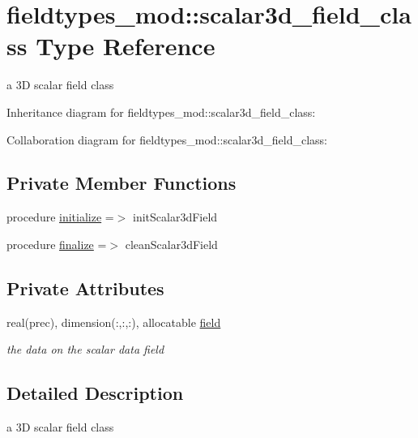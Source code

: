 \hypertarget{structfieldtypes__mod_1_1scalar3d__field__class}{}\section{fieldtypes\+\_\+mod\+:\+:scalar3d\+\_\+field\+\_\+class Type Reference}
\label{structfieldtypes__mod_1_1scalar3d__field__class}


a 3D scalar field class  




Inheritance diagram for fieldtypes\+\_\+mod\+:\+:scalar3d\+\_\+field\+\_\+class\+:


Collaboration diagram for fieldtypes\+\_\+mod\+:\+:scalar3d\+\_\+field\+\_\+class\+:
\subsection*{Private Member Functions}
\begin{DoxyCompactItemize}
\item 
procedure \mbox{\hyperlink{structfieldtypes__mod_1_1scalar3d__field__class_a17196befda9da8db8f792c933f95a252}{initialize}} =$>$ init\+Scalar3d\+Field
\item 
procedure \mbox{\hyperlink{structfieldtypes__mod_1_1scalar3d__field__class_a03d4eea65560932a072e14355830d43a}{finalize}} =$>$ clean\+Scalar3d\+Field
\end{DoxyCompactItemize}
\subsection*{Private Attributes}
\begin{DoxyCompactItemize}
\item 
real(prec), dimension(\+:,\+:,\+:), allocatable \mbox{\hyperlink{structfieldtypes__mod_1_1scalar3d__field__class_a1fc76fc336c07c0189299ae64fee564f}{field}}
\begin{DoxyCompactList}\small\item\em the data on the scalar data field \end{DoxyCompactList}\end{DoxyCompactItemize}


\subsection{Detailed Description}
a 3D scalar field class 

